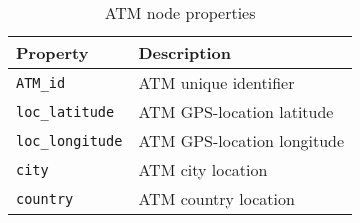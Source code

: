 \begin{table}[H]
    \centering
    \begin{tabular}{|l|l|}
    \hline
    \textbf{Property}        & \textbf{Description}                                      \\ \hline
    \texttt{ATM\_id}      & ATM unique identifier                             \\ \hline
    \texttt{loc\_latitude}  & ATM GPS-location latitude           \\ \hline
    \texttt{loc\_longitude} & ATM GPS-location longitude          \\ \hline
    \texttt{city}         & ATM city location                         \\ \hline
    \texttt{country}      & ATM country location                       \\ \hline
    \end{tabular}
    \caption{ATM node properties}
    \label{table:atm-node-properties}
\end{table}